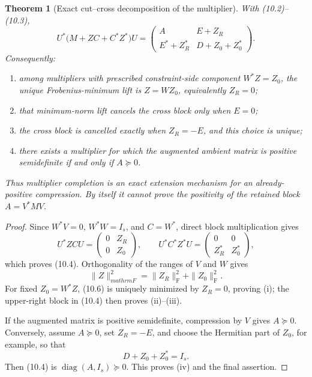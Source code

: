 \documentclass[11pt,oneside]{article}
\newtheorem{theorem}{Theorem}[section]
\theoremstyle{definition}
\theoremstyle{remark}
\begin{document}
\begin{theorem}[Exact cut--cross decomposition of the multiplier]
\label{thm:newv10-multiplier}
With (10.2)--(10.3),
\[
 U^*\bigl(M+ZC+C^*Z^*\bigr)U
 =
 \begin{pmatrix}
 A&E+Z_R\\
 E^*+Z_R^*&D+Z_0+Z_0^*
 \end{pmatrix}.                                          \tag{10.7}
\]
Consequently:
\begin{enumerate}[label=\textup{(\roman*)}]
\item among multipliers with prescribed constraint-side component
      \(W^*Z=Z_0\), the unique Frobenius-minimum lift is
      \(Z=WZ_0\), equivalently \(Z_R=0\);
\item that minimum-norm lift cancels the cross block only when
      \(E=0\);
\item the cross block is cancelled exactly when \(Z_R=-E\), and this
      choice is unique;
\item there exists a multiplier for which the augmented ambient
      matrix is positive semidefinite if and only if \(A\succeq0\).
\end{enumerate}
Thus multiplier completion is an exact extension mechanism for an
already-positive compression.  By itself it cannot prove the
positivity of the retained block \(A=V^*MV\).
\end{theorem}

\begin{proof}
Since \(W^*V=0\), \(W^*W=I_s\), and \(C=W^*\), direct block
multiplication gives
\[
 U^*ZCU=
 \begin{pmatrix}0&Z_R\\0&Z_0\end{pmatrix},
 \qquad
 U^*C^*Z^*U=
 \begin{pmatrix}0&0\\Z_R^*&Z_0^*\end{pmatrix},          \tag{10.8}
\]
which proves (10.4).  Orthogonality of the ranges of \(V\) and
\(W\) gives
\[
 \|Z\|_{mathrm F}^2
 =\|Z_R\|_{\mathrm F}^2+\|Z_0\|_{\mathrm F}^2.           \tag{10.9}
\]
For fixed \(Z_0=W^*Z\), (10.6) is uniquely minimized by \(Z_R=0\),
proving (i); the upper-right block in (10.4) then proves (ii)--(iii).

If the augmented matrix is positive semidefinite, compression by
\(V\) gives \(A\succeq0\).  Conversely, assume \(A\succeq0\), set
\(Z_R=-E\), and choose the Hermitian part of \(Z_0\), for example,
so that
\[
 D+Z_0+Z_0^*=I_s .                                       \tag{10.10}
\]
Then (10.4) is \(\operatorname{diag}(A,I_s)\succeq0\).
This proves (iv) and the final assertion.
\end{proof}
\end{document}
